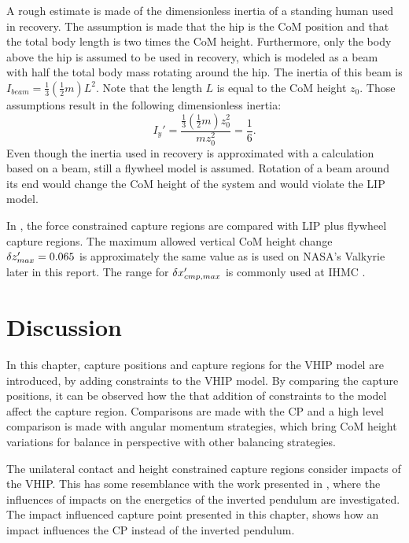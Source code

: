 A rough estimate is made of the dimensionless inertia of a standing human used in recovery. The assumption is made that the hip is the \ac{CoM} position \cite{gard2004comparison} and that the total body length is two times the \ac{CoM} height. Furthermore, only the body above the hip is assumed to be used in recovery, which is modeled as a beam with half the total body mass rotating around the hip. The inertia of this beam is $I_{beam} = \frac{1}{3}(\frac{1}{2}m)L^2$. Note that the length $L$ is equal to the \ac{CoM} height $z_0$. Those assumptions result in the following dimensionless inertia:
\begin{equation}
	I_y' = \frac{\frac{1}{3}(\frac{1}{2}m)z_0^2}{mz_0^2} = \frac{1}{6}.
\end{equation}
Even though the inertia used in recovery is approximated with a calculation based on a beam, still a flywheel model is assumed. Rotation of a beam around its end would change the \ac{CoM} height of the system and would violate the \ac{LIP} model.

In , the force constrained capture regions are compared with \ac{LIP} plus flywheel capture regions. The maximum allowed vertical \ac{CoM} height change $\delta z_{max}' =0.065$ is approximately the same value as is used on NASA's Valkyrie later in this report. The range for $\delta x_{cmp,max}'$ is commonly used at \ac{IHMC} \cite{griffin2017natural}.

\section{Discussion}
In this chapter, capture positions and capture regions for the \ac{VHIP} model are introduced, by adding constraints to the \ac{VHIP} model. By comparing the capture positions, it can be observed how the that addition of constraints to the model affect the capture region. Comparisons are made with the \ac{CP} and a high level comparison is made with angular momentum strategies, which bring \ac{CoM} height variations for balance in perspective with other balancing strategies.

The unilateral contact and height constrained capture regions consider impacts of the \ac{VHIP}. This has some resemblance with the work presented in \cite{kuo2005energetic}, where the influences of impacts on the energetics of the inverted pendulum are investigated. The impact influenced capture point presented in this chapter, shows how an impact influences the \ac{CP} instead of the inverted pendulum.

